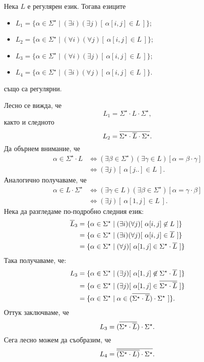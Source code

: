 \begin{problem}
  Нека $L$ е регулярен език.
  Тогава езиците
  \begin{itemize}
  \item
    $L_1 = \{ \alpha \in \Sigma^\star \mid (\exists i)(\exists j)[\ \alpha[i,j] \in L\ ]\}$;
  \item
    $L_2 = \{ \alpha \in \Sigma^\star \mid (\forall i)(\forall j)[\ \alpha[i,j] \in L\ ]\}$;
  \item 
    $L_3 = \{ \alpha \in \Sigma^\star \mid (\forall i)(\exists j)[\ \alpha[i,j] \in L\ ]\}$;
  \item
    $L_4 = \{ \alpha \in \Sigma^\star \mid (\exists i)(\forall j)[\ \alpha[i,j] \in L\ ]\}$.
  \end{itemize}
  също са регулярни.
\end{problem}
\begin{hint}
  Лесно се вижда, че
  \[L_1 = \Sigma^\star \cdot L \cdot \Sigma^\star,\]
  както и следното
  \[L_2 = \overline{\Sigma^\star \cdot \overline{L} \cdot \Sigma^\star}.\]
  Да обърнем внимание, че
  \begin{align*}
    \alpha \in \Sigma^\star \cdot L & \iff (\exists \beta \in \Sigma^\star)(\exists \gamma \in L)[ \alpha = \beta \cdot \gamma]\\
                                    & \iff (\exists j)[\ \alpha[j..] \in L\ ].
  \end{align*}
  Аналогично получаваме, че
    \begin{align*}
      \alpha \in L\cdot \Sigma^\star & \iff (\exists \gamma \in L)(\exists \beta \in \Sigma^\star)[ \alpha = \gamma \cdot \beta ]\\
                                     & \iff (\exists j)[\ \alpha[1,j] \in L\ ].
  \end{align*}
  Нека да разгледаме по-подробно следния език:
  \begin{align*}
    \ov{L}_3 & = \{\alpha \in \Sigma^\star \mid (\exists i)(\forall j)[\ \alpha[i,j] \not\in L\ ]\}\\
             & = \{\alpha \in \Sigma^\star \mid (\exists i)(\forall j)[\ \alpha[i,j] \in \ov{L}\ ]\}\\
             & = \{\alpha \in \Sigma^\star \mid (\forall j)[\ \alpha[1,j] \in \Sigma^\star \cdot \ov{L}\ ]\}\\
  \end{align*}
  Така получаваме, че:
  \begin{align*}
    L_3 & = \{\alpha \in \Sigma^\star \mid (\exists j)[\ \alpha[1,j] \not\in \Sigma^\star \cdot \overline{L}\ ]\}\\
        & = \{\alpha \in \Sigma^\star \mid (\exists j)[\ \alpha[1,j] \in \overline{\Sigma^\star \cdot \overline{L}}\ ]\}\\
        & = \{\alpha \in \Sigma^\star \mid \alpha \in (\overline{\Sigma^\star \cdot \overline{L}}) \cdot \Sigma^\star \ ]\}.
  \end{align*}
  Оттук заключваме, че
  \[L_3 = (\overline{\Sigma^\star \cdot \overline{L}}) \cdot \Sigma^\star.\]
  Сега лесно можем да съобразим, че
  \[ L_4 = \overline{ \overline{(\Sigma^\star \cdot L)} \cdot \Sigma^\star}.\]
\end{hint}


